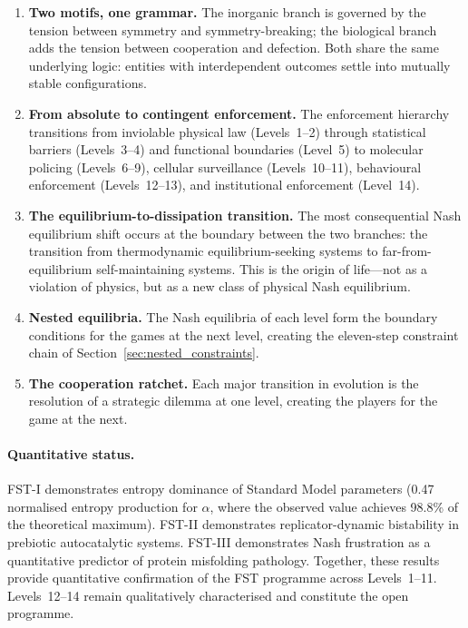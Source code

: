 \documentclass[12pt,a4paper]{article}
\theoremstyle{remark}
\begin{document}
\begin{enumerate}
  \item \textbf{Two motifs, one grammar.} The inorganic branch is governed by the tension between symmetry and symmetry-breaking; the biological branch adds the tension between cooperation and defection. Both share the same underlying logic: entities with interdependent outcomes settle into mutually stable configurations.

  \item \textbf{From absolute to contingent enforcement.} The enforcement hierarchy transitions from inviolable physical law (Levels~1--2) through statistical barriers (Levels~3--4) and functional boundaries (Level~5) to molecular policing (Levels~6--9), cellular surveillance (Levels~10--11), behavioural enforcement (Levels~12--13), and institutional enforcement (Level~14).

  \item \textbf{The equilibrium-to-dissipation transition.} The most consequential Nash equilibrium shift occurs at the boundary between the two branches: the transition from thermodynamic equilibrium-seeking systems to far-from-equilibrium self-maintaining systems. This is the origin of life---not as a violation of physics, but as a new class of physical Nash equilibrium.

  \item \textbf{Nested equilibria.} The Nash equilibria of each level form the boundary conditions for the games at the next level, creating the eleven-step constraint chain of Section~\ref{sec:nested_constraints}.

  \item \textbf{The cooperation ratchet.} Each major transition in evolution is the resolution of a strategic dilemma at one level, creating the players for the game at the next.
\end{enumerate}

\paragraph{Quantitative status.}
FST-I demonstrates entropy dominance of Standard Model parameters (0.47 normalised entropy production for $\alpha$, where the observed value achieves 98.8\% of the theoretical maximum). FST-II demonstrates replicator-dynamic bistability in prebiotic autocatalytic systems. FST-III demonstrates Nash frustration as a quantitative predictor of protein misfolding pathology. Together, these results provide quantitative confirmation of the FST programme across Levels~1--11. Levels~12--14 remain qualitatively characterised and constitute the open programme.
\end{document}
